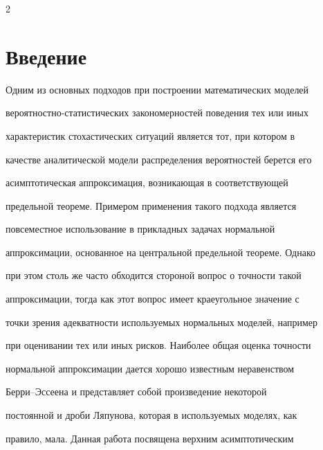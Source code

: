 




      \thispagestyle{headings}





      \begin{multicols}{2}





      \label{st\stat}





\section{Введение}





Одним из основных подходов при построении математических моделей


вероятностно-ста\-тис\-ти\-ческих закономерностей поведения тех или иных


характеристик стохастических ситуаций является тот, при котором в


качестве аналитической модели распределения вероятностей берется его


асимптотическая аппроксимация, воз\-ни\-ка\-ющая в соответствующей


предельной теореме. Примером применения такого подхода является


повсеместное использование в прикладных задачах нормальной


аппроксимации, основанное на центральной предельной теореме. Однако


при этом столь же часто обходится стороной вопрос о точности такой


аппроксимации, тогда как этот вопрос имеет крае\-уголь\-ное значение с


точки зрения аде\-кват\-ности используемых нормальных моделей, например


при оценивании тех или иных рисков. Наиболее общая оценка точности


нормальной аппроксимации дается хорошо известным неравенством


Берри--Эс\-се\-ена и представляет собой произведение некоторой


постоянной и дроби Ляпунова, которая в используемых моделях, как


правило, мала. Данная работа посвящена верхним асимптотическим



\end{multicols}
